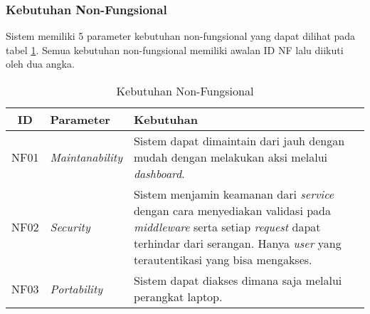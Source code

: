\subsubsection{Kebutuhan Non-Fungsional}
Sistem memiliki 5 parameter kebutuhan non-fungsional yang dapat dilihat pada tabel \ref{tab:kebutuhan-non-fungsional}. Semua kebutuhan non-fungsional memiliki awalan ID NF lalu diikuti oleh dua angka.

\bgroup
\begin{table}[ht]
  \def\arraystretch{1.7}
  \caption{Kebutuhan Non-Fungsional}
  \label{tab:kebutuhan-non-fungsional}
  \centering
  \begin{tabular}{|c|p{3cm}|p{8cm}|}
    \hline
    ID   & Parameter               & Kebutuhan                                                                                                                                                                                                                          \\
    \hline
    NF01 & \textit{Maintanability} & Sistem dapat dimaintain dari jauh dengan mudah dengan melakukan aksi melalui \textit{dashboard}.                                                                                                                                   \\
    \hline
    NF02 & \textit{Security}       & Sistem menjamin keamanan dari \textit{service} dengan cara menyediakan validasi pada \textit{middleware} serta setiap \textit{request} dapat terhindar dari serangan. Hanya \textit{user} yang terautentikasi yang bisa mengakses. \\
    \hline
    NF03 & \textit{Portability}    & Sistem dapat diakses dimana saja melalui perangkat laptop.                                                                                                                                                                         \\
    \hline
  \end{tabular}
\end{table}
\egroup